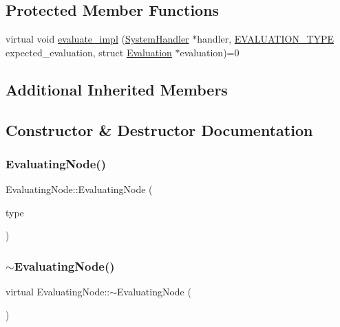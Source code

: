 \subsection*{Protected Member Functions}
\begin{DoxyCompactItemize}
\item 
virtual void \hyperlink{classEvaluatingNode_a085fa06e0b46a93c814dc55cda0c1b26}{evaluate\+\_\+impl} (\hyperlink{classSystemHandler}{System\+Handler} $\ast$handler, \hyperlink{statics_8h_a6664c451ca7787483a7981cc1de68dbb}{E\+V\+A\+L\+U\+A\+T\+I\+O\+N\+\_\+\+T\+Y\+PE} expected\+\_\+evaluation, struct \hyperlink{structEvaluation}{Evaluation} $\ast$evaluation)=0
\end{DoxyCompactItemize}
\subsection*{Additional Inherited Members}


\subsection{Constructor \& Destructor Documentation}
\mbox{\label{classEvaluatingNode_a0ece59961a22a6f07d53e75f41707683}} 
\subsubsection{\texorpdfstring{Evaluating\+Node()}{EvaluatingNode()}}
{\footnotesize\ttfamily Evaluating\+Node\+::\+Evaluating\+Node (\begin{DoxyParamCaption}\item[{\hyperlink{statics_8h_a1ec6d4bfce2e004debbc141eafc512db}{N\+O\+D\+E\+\_\+\+T\+Y\+PE}}]{type }\end{DoxyParamCaption})}

\mbox{\label{classEvaluatingNode_aac142cb781f91833f01c537f3b76b1d2}} 
\subsubsection{\texorpdfstring{$\sim$\+Evaluating\+Node()}{~EvaluatingNode()}}
{\footnotesize\ttfamily virtual Evaluating\+Node\+::$\sim$\+Evaluating\+Node (\begin{DoxyParamCaption}{ }\end{DoxyParamCaption})\hspace{0.3cm}{\ttfamily [virtual]}}



